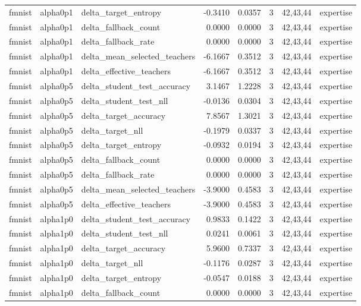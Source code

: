\begin{tabular}{lllrrrll}
fmnist & alpha0p1 & delta\_target\_entropy & -0.3410 & 0.0357 & 3 & 42,43,44 & expertise \\
fmnist & alpha0p1 & delta\_fallback\_count & 0.0000 & 0.0000 & 3 & 42,43,44 & expertise \\
fmnist & alpha0p1 & delta\_fallback\_rate & 0.0000 & 0.0000 & 3 & 42,43,44 & expertise \\
fmnist & alpha0p1 & delta\_mean\_selected\_teachers & -6.1667 & 0.3512 & 3 & 42,43,44 & expertise \\
fmnist & alpha0p1 & delta\_effective\_teachers & -6.1667 & 0.3512 & 3 & 42,43,44 & expertise \\
fmnist & alpha0p5 & delta\_student\_test\_accuracy & 3.1467 & 1.2228 & 3 & 42,43,44 & expertise \\
fmnist & alpha0p5 & delta\_student\_test\_nll & -0.0136 & 0.0304 & 3 & 42,43,44 & expertise \\
fmnist & alpha0p5 & delta\_target\_accuracy & 7.8567 & 1.3021 & 3 & 42,43,44 & expertise \\
fmnist & alpha0p5 & delta\_target\_nll & -0.1979 & 0.0337 & 3 & 42,43,44 & expertise \\
fmnist & alpha0p5 & delta\_target\_entropy & -0.0932 & 0.0194 & 3 & 42,43,44 & expertise \\
fmnist & alpha0p5 & delta\_fallback\_count & 0.0000 & 0.0000 & 3 & 42,43,44 & expertise \\
fmnist & alpha0p5 & delta\_fallback\_rate & 0.0000 & 0.0000 & 3 & 42,43,44 & expertise \\
fmnist & alpha0p5 & delta\_mean\_selected\_teachers & -3.9000 & 0.4583 & 3 & 42,43,44 & expertise \\
fmnist & alpha0p5 & delta\_effective\_teachers & -3.9000 & 0.4583 & 3 & 42,43,44 & expertise \\
fmnist & alpha1p0 & delta\_student\_test\_accuracy & 0.9833 & 0.1422 & 3 & 42,43,44 & expertise \\
fmnist & alpha1p0 & delta\_student\_test\_nll & 0.0241 & 0.0061 & 3 & 42,43,44 & expertise \\
fmnist & alpha1p0 & delta\_target\_accuracy & 5.9600 & 0.7337 & 3 & 42,43,44 & expertise \\
fmnist & alpha1p0 & delta\_target\_nll & -0.1176 & 0.0287 & 3 & 42,43,44 & expertise \\
fmnist & alpha1p0 & delta\_target\_entropy & -0.0547 & 0.0188 & 3 & 42,43,44 & expertise \\
fmnist & alpha1p0 & delta\_fallback\_count & 0.0000 & 0.0000 & 3 & 42,43,44 & expertise \\

\end{tabular}
